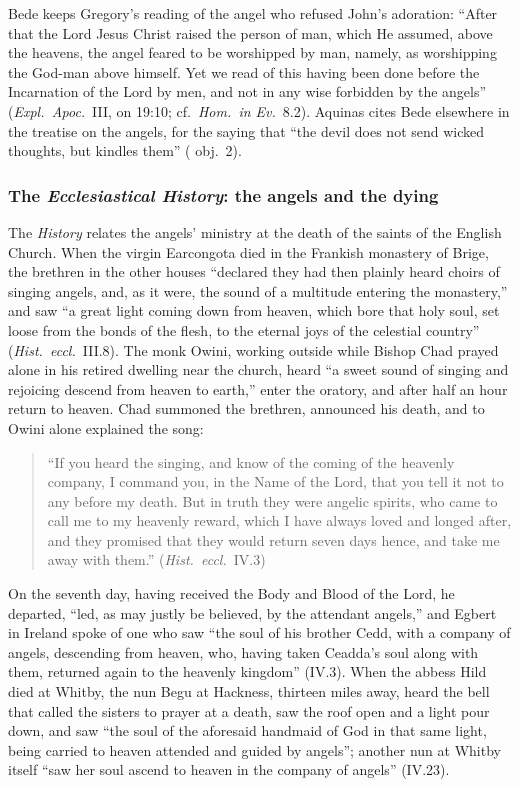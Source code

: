 Bede keeps Gregory's reading of the angel who refused John's adoration: ``After
that the Lord Jesus Christ raised the person of man, which He assumed, above
the heavens, the angel feared to be worshipped by man, namely, as worshipping
the God-man above himself. Yet we read of this having been done before the
Incarnation of the Lord by men, and not in any wise forbidden by the angels''
(\emph{Expl.\ Apoc.}\ III, on 19:10; cf.\ \emph{Hom.\ in Ev.}\ 8.2).
Aquinas cites Bede elsewhere in the treatise on the angels, for the saying
that ``the devil does not send wicked thoughts, but kindles them'' ( obj.~2).

\subsubsection{The \emph{Ecclesiastical History}: the angels and the dying}

The \emph{History} relates the angels' ministry at the death of the saints of
the English Church. When the virgin Earcongota died in the Frankish
monastery of Brige, the brethren in the other houses
``declared they had then plainly heard choirs of singing angels, and, as it
were, the sound of a multitude entering the monastery,'' and saw ``a great
light coming down from heaven, which bore that holy soul, set loose from the
bonds of the flesh, to the eternal joys of the celestial country''
(\emph{Hist.\ eccl.}\ III.8). The monk Owini, working outside while
Bishop Chad prayed alone in his retired dwelling near the church, heard ``a sweet sound
of singing and rejoicing descend from heaven to earth,'' enter the oratory,
and after half an hour return to heaven. Chad summoned the brethren,
announced his death, and to Owini alone explained the song:

\begin{quote}
``If you heard the singing, and know of the coming of the heavenly company, I
command you, in the Name of the Lord, that you tell it not to any before my
death. But in truth they were angelic spirits, who came to call me to my
heavenly reward, which I have always loved and longed after, and they
promised that they would return seven days hence, and take me away with
them.'' (\emph{Hist.\ eccl.}\ IV.3)
\end{quote}

\noindent On the seventh day, having received the Body and Blood of the Lord,
he departed, ``led, as may justly be believed, by the attendant angels,'' and
Egbert in Ireland spoke of one who saw ``the soul of his brother Cedd, with a
company of angels, descending from heaven, who, having taken Ceadda's soul
along with them, returned again to the heavenly kingdom'' (IV.3). When the
abbess Hild died at Whitby, the nun Begu at Hackness, thirteen miles away,
heard the bell that called the sisters to prayer at a death, saw the roof
open and a light pour down, and saw ``the soul of the aforesaid handmaid of
God in that same light, being carried to heaven attended and guided by
angels''; another nun at Whitby itself ``saw her soul ascend to heaven in the
company of angels'' (IV.23).

